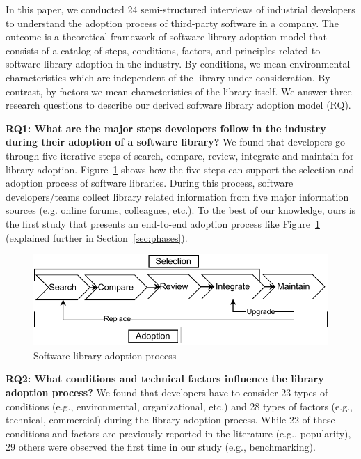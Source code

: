 \documentclass[sigconf,review,anonymous, table]{acmart}
\def\bf{\textbf}
\def\fig {Figure~}
\def\sec {Section~}
\newcommand{\nd}{\vspace{1mm}\noindent}
\begin{document}
In this paper, we conducted 24 semi-structured interviews of industrial developers to understand the adoption process of third-party software in a company. The outcome is a theoretical framework of software library adoption model that consists of a catalog of steps, conditions, factors, and principles related to software library adoption in the industry. By conditions, we mean environmental characteristics which are independent of the library under consideration. By contrast, by factors we mean characteristics of the library itself. We answer three research questions to describe our derived software library adoption model (RQ).

\nd\bf{RQ1: What are the major steps developers follow in the industry during their adoption of a software library?} We found that developers go through five iterative steps of search, compare, review, integrate and maintain for library adoption. \fig\ref{fig:adoption-process} shows how the five steps can support the selection and adoption process of software libraries. During this process, software developers/teams collect library related information from five major information sources (e.g. online forums, colleagues, etc.). To the best of our knowledge, ours is the first study that presents an end-to-end adoption process like \fig\ref{fig:adoption-process} (explained further in \sec\ref{sec:phases}).
\begin{figure}[h]
    \centering
    \includegraphics[scale=.6]{images/adoption-process.pdf}
    \caption{Software library adoption process}
    \label{fig:adoption-process}
\end{figure}

\nd\bf{RQ2: What conditions and technical factors influence the library adoption process?}
We found that developers have to consider 23 types of conditions (e.g., environmental, organizational, etc.) and 28 types of factors (e.g., technical, commercial)  during the library adoption process. While 22 of these conditions and factors are previously reported in the literature  (e.g., popularity), 29 others were observed the first time in our study (e.g., benchmarking).
\end{document}

